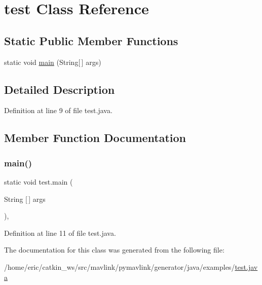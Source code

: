 \hypertarget{classtest}{}\section{test Class Reference}
\label{classtest}
\subsection*{Static Public Member Functions}
\begin{DoxyCompactItemize}
\item 
static void \mbox{\hyperlink{classtest_ad4ba96bceb9e7b2c011c5bf6cbabb965}{main}} (String\mbox{[}$\,$\mbox{]} args)
\end{DoxyCompactItemize}


\subsection{Detailed Description}


Definition at line 9 of file test.\+java.



\subsection{Member Function Documentation}
\mbox{\label{classtest_ad4ba96bceb9e7b2c011c5bf6cbabb965}} 
\subsubsection{\texorpdfstring{main()}{main()}}
{\footnotesize\ttfamily static void test.\+main (\begin{DoxyParamCaption}\item[{String \mbox{[}$\,$\mbox{]}}]{args }\end{DoxyParamCaption})\hspace{0.3cm}{\ttfamily [inline]}, {\ttfamily [static]}}



Definition at line 11 of file test.\+java.



The documentation for this class was generated from the following file\+:\begin{DoxyCompactItemize}
\item 
/home/eric/catkin\+\_\+ws/src/mavlink/pymavlink/generator/java/examples/\mbox{\hyperlink{test_8java}{test.\+java}}\end{DoxyCompactItemize}
